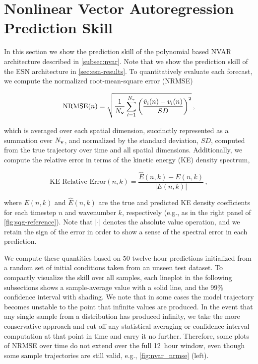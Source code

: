 \documentclass[draft]{agujournal2019}
\begin{document}
\section{Nonlinear Vector Autoregression Prediction Skill}
\label{sec:nvar-results}

In this section we show the prediction skill of the polynomial based NVAR architecture
described in \cref{subsec:nvar}.
Note that we show the prediction skill of the ESN architecture in
\cref{sec:esn-results}.
To quantitatively evaluate each forecast, we compute
the normalized root-mean-square error (NRMSE)
\begin{linenomath*}\begin{equation}
    \text{NRMSE}(n) = \sqrt{\dfrac{1}{N_{\mathbf{v}}}\sum_{i=1}^{N_{\mathbf{v}}}\left(
        \dfrac{\hat{v}_i(n) - v_i(n)}{SD}
        \right)^2 } \, ,
    \label{eq:nrmse}
\end{equation}\end{linenomath*}
which is averaged over each spatial dimension, succinctly represented as a
summation over $N_{\mathbf{v}}$, and normalized by the standard deviation, $SD$,
computed from the true trajectory over time and all spatial dimensions.
Additionally, we compute the relative error in terms of the kinetic energy
(KE) density spectrum,
\begin{linenomath*}\begin{equation}
    \text{KE Relative Error}(n, k) =
    \dfrac{\hat{E}(n, k) - E(n, k)}{|E(n,k)|} \, ,
    \label{eq:ke_relerr}
\end{equation}\end{linenomath*}
where $E(n,k)$ and $\hat{E}(n,k)$ are the true and predicted KE density coefficients
for each timestep $n$ and wavenumber $k$, respectively (e.g., as in the right
panel of \cref{fig:sqg-reference}).
Note that $|\cdot|$ denotes the absolute value operation,
and we retain the sign of the error in order to show a sense of the
spectral error in each prediction.

We compute these quantities based on 50 twelve-hour predictions initialized from a random
set of initial conditions taken from an unseen test dataset.
To compactly visualize the skill over all samples, each lineplot in the
following subsections shows a sample-average value with a solid line, and the
99\% confidence interval with shading.
We note that in some cases the model trajectory becomes unstable to the point
that infinite values are produced.
In the event that any single sample from a distribution has produced infinity,
we take the more conservative approach and cut off any statistical averaging or
confidence interval computation at that point in time and carry it no further.
Therefore, some plots of NRMSE over time do not extend over the full 12~hour
window, even though some sample trajectories are still valid, e.g.,
\cref{fig:nvar_nrmse} (left).
\end{document}
